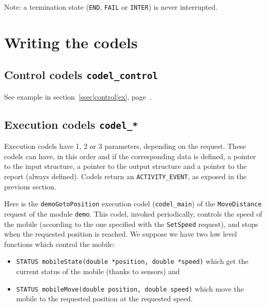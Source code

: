 Note: a termination state ({\tt END}, {\tt FAIL} or {\tt INTER}) is never
interrupted.



\section{Writing the codels}
\label{sec|codels|writing}


\subsection{Control codels  {\tt codel\_control}}

See        example            in           section~\ref{ssec|control|ex},
page~\pageref{ssec|control|ex}.

\subsection{Execution codels  {\tt codel\_*}}

Execution  codels have 1,  2 or 3  parameters,  depending on the request.
These codels can have,  in this order and   if the corresponding  data is
defined,  a pointer to  the   input structure,  a pointer  to  the output
structure and a pointer to the report (always  defined). Codels return an
{\tt ACTIVITY\_EVENT}, as exposed in the previous section.

Here is the {\tt demoGotoPosition}  execution codel ({\tt codel\_main})
of the {\tt MoveDistance} request of the module {\tt demo}. This codel,
invoked periodically, controls the speed of the mobile (according to the
one specified with the {\tt SetSpeed} request), and stops when the
requested position is reached. We suppose we have two low level functions
which control the mobile:

\begin{itemize}
\item {\tt STATUS mobileState(double *position, double *speed)} which get
the current status of the mobile (thanks to sensors) and
\item {\tt STATUS mobileMove(double position, double speed)} which move
the mobile to the requested position at the requested speed.
\end{itemize}

